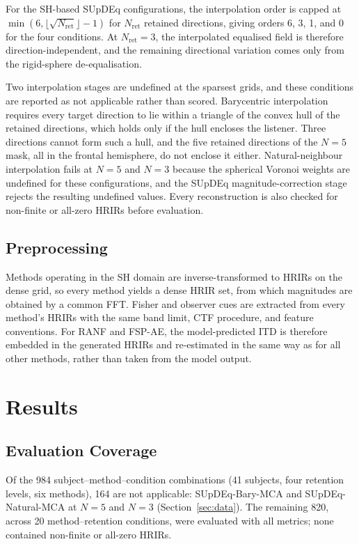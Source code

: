 \documentclass[journal]{IEEEtran}
\begin{document}
For the SH-based SUpDEq configurations, the interpolation order is capped at \(\min(6,\lfloor\sqrt{N_{\mathrm{ret}}}\rfloor-1)\) for \(N_{\mathrm{ret}}\) retained directions, giving orders 6, 3, 1, and 0 for the four conditions. At \(N_{\mathrm{ret}}=3\), the interpolated equalised field is therefore direction-independent, and the remaining directional variation comes only from the rigid-sphere de-equalisation.

Two interpolation stages are undefined at the sparsest grids, and these conditions are reported as not applicable rather than scored. Barycentric interpolation requires every target direction to lie within a triangle of the convex hull of the retained directions, which holds only if the hull encloses the listener. Three directions cannot form such a hull, and the five retained directions of the \(N=5\) mask, all in the frontal hemisphere, do not enclose it either. Natural-neighbour interpolation fails at \(N=5\) and \(N=3\) because the spherical Voronoi weights are undefined for these configurations, and the SUpDEq magnitude-correction stage rejects the resulting undefined values. Every reconstruction is also checked for non-finite or all-zero HRIRs before evaluation.

\subsection{Preprocessing}
Methods operating in the SH domain are inverse-transformed to HRIRs on the dense grid, so every method yields a dense HRIR set, from which magnitudes are obtained by a common FFT. Fisher and observer cues are extracted from every method's HRIRs with the same band limit, CTF procedure, and feature conventions. For RANF and FSP-AE, the model-predicted ITD is therefore embedded in the generated HRIRs and re-estimated in the same way as for all other methods, rather than taken from the model output.
\section{Results}
\subsection{Evaluation Coverage}
Of the 984 subject--method--condition combinations (41 subjects, four retention levels, six methods), 164 are not applicable: SUpDEq-Bary-MCA and SUpDEq-Natural-MCA at \(N=5\) and \(N=3\) (Section~\ref{sec:data}). The remaining 820, across 20 method--retention conditions, were evaluated with all metrics; none contained non-finite or all-zero HRIRs.
\end{document}
